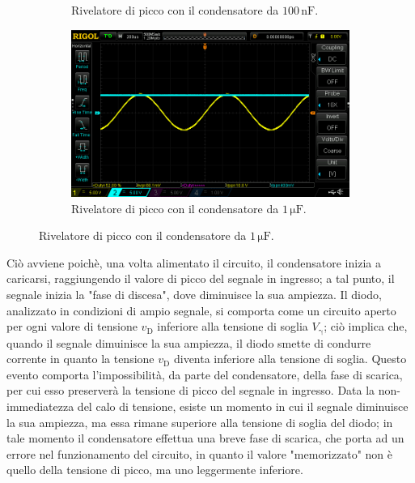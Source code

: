 \documentclass[a4paper]{article}
\begin{document}
\begin{figure}[h!]
\begin{subfigure}{0.4\textwidth}
					\caption{Rivelatore di picco con il condensatore da $ 100 \, \mathrm{nF} $.}
				\end{subfigure}
				\begin{subfigure}{1\textwidth}
					\centering
					\includegraphics[scale=0.4]{rivelatoreDiPicco1micro}
					\caption{Rivelatore di picco con il condensatore da $ 1 \, \mathrm{\mu F} $.}
				\end{subfigure}
				\label{fig:rivelatoreDiPicco}
			\end{figure}
			\newpage
			Ciò avviene poichè, una volta alimentato il circuito, il condensatore inizia a caricarsi, raggiungendo il valore di picco del segnale in ingresso; a tal punto, il segnale inizia la "fase di discesa", dove diminuisce la sua ampiezza.
			\newline
			Il diodo, analizzato in condizioni di ampio segnale, si comporta come un circuito aperto per ogni valore di tensione $ v_{\mathrm{D}} $ inferiore alla tensione di soglia $ V_{\mathrm{\gamma}} $; ciò implica che, quando il segnale dimuinisce la sua ampiezza, il diodo smette di condurre corrente in quanto la tensione $ v_{\mathrm{D}} $ diventa inferiore alla tensione di soglia.
			\newline
			Questo evento comporta l'impossibilità, da parte del condensatore, della fase di scarica, per cui esso preserverà la tensione di picco del segnale in ingresso.
			Data la non-immediatezza del calo di tensione, esiste un momento in cui il segnale diminuisce la sua ampiezza, ma essa rimane superiore alla tensione di soglia del diodo; in tale momento il condensatore effettua una breve fase di scarica, che porta ad un errore nel funzionamento del circuito, in quanto il valore "memorizzato" non è quello della tensione di picco, ma uno leggermente inferiore.
\end{document}
